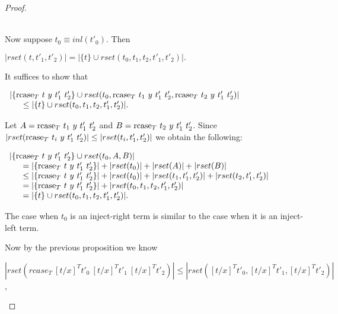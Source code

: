 \begin{proof}
\begin{itemize}
\begin{itemize}
    \ \\
    Now suppose $t_0 \equiv inl(t'_0)$.  Then
    \begin{center}
      \begin{math}
        |rset(t, t'_1, t'_2)| = |\{t\} \cup rset(t_0, t_1, t_2, t'_1, t'_2)|.
      \end{math}
    \end{center}
    It suffices to show that 
    \begin{center}
      \begin{math}
        \begin{array}{lll}
          |\{\mbox{rcase}_{T}\ t\ y\ t'_1\ t'_2\} \cup
          rset(t_0,\mbox{rcase}_{T}\ t_1\ y\ t'_1\ t'_2,\mbox{rcase}_{T}\ t_2\ y\ t'_1\ t'_2)|\\
          \text{\ \ \ \ } \leq |\{t\} \cup rset(t_0, t_1, t_2, t'_1, t'_2)|.
        \end{array}
      \end{math}
    \end{center}
    Let $A = \mbox{rcase}_{T}\ t_1\ y\ t'_1\ t'_2$ and $B = \mbox{rcase}_{T}\ t_2\ y\ t'_1\ t'_2$. Since \\
    $|rset(\mbox{rcase}_{T}\ t_i\ y\ t'_1\ t'_2)| \leq |rset(t_i,t'_1,t'_2)|$ we obtain the following:
    \begin{center}
      \begin{math}
        \begin{array}{lll}
          |\{\mbox{rcase}_{T}\ t\ y\ t'_1\ t'_2\} \cup rset(t_0,A,B)|\\
          \text{\ \ \ \ } = |\{\mbox{rcase}_{T}\ t\ y\ t'_1\ t'_2\}| + |rset(t_0)| + |rset(A)| + |rset(B)|\\
          \text{\ \ \ \ } \leq |\{\mbox{rcase}_{T}\ t\ y\ t'_1\ t'_2\}| +
          |rset(t_0)| + |rset(t_1,t'_1,t'_2)| + |rset(t_2,t'_1,t'_2)|\\
          \text{\ \ \ \ } = |\{\mbox{rcase}_{T}\ t\ y\ t'_1\ t'_2\}| + |rset(t_0, t_1,t_2,t'_1,t'_2)|\\
          \text{\ \ \ \ } = |\{t\} \cup rset(t_0, t_1, t_2, t'_1, t'_2)|.\\
        \end{array}
      \end{math}
    \end{center}
    The case when $t_0$ is an inject-right term is similar to the case when it is an inject-left term.
  \end{itemize}
  Now by the previous proposition we know 
  \begin{center}
    $|rset(rcase_T\ [t/x]^T t'_0\ [t/x]^T t'_1\ [t/x]^T t'_2)| \leq |rset([t/x]^T t'_0, [t/x]^T t'_1, [t/x]^T t'_2)|$,

\end{center}
\end{itemize}
\end{proof}
